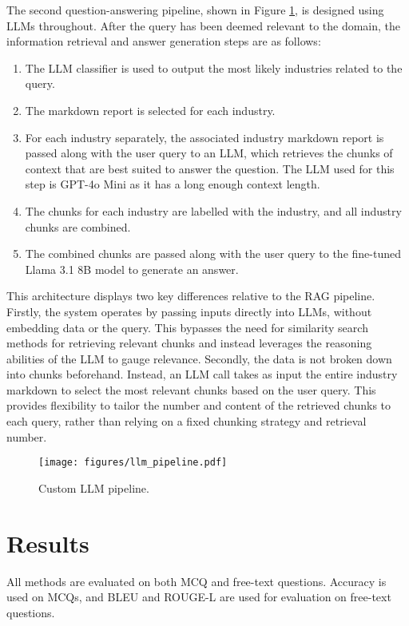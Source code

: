 The second question-answering pipeline, shown in Figure \ref{fig:llm_rag}, is designed using LLMs throughout. After the query has been deemed relevant to the domain, the information retrieval and answer generation steps are as follows:
\begin{enumerate}
    \item The LLM classifier is used to output the most likely industries related to the query.
    \item The markdown report is selected for each industry. 
    \item For each industry separately, the associated industry markdown report is passed along with the user query to an LLM, which retrieves the chunks of context that are best suited to answer the question. The LLM used for this step is GPT-4o Mini as it has a long enough context length.
    \item The chunks for each industry are labelled with the industry, and all industry chunks are combined.
    \item The combined chunks are passed along with the user query to the fine-tuned Llama 3.1 8B model to generate an answer.
\end{enumerate}


This architecture displays two key differences relative to the RAG pipeline. Firstly, the system operates by passing inputs directly into LLMs, without embedding data or the query. This bypasses the need for similarity search methods for retrieving relevant chunks and instead leverages the reasoning abilities of the LLM to gauge relevance. Secondly, the data is not broken down into chunks beforehand. Instead, an LLM call takes as input the entire industry markdown to select the most relevant chunks based on the user query. This provides flexibility to tailor the number and content of the retrieved chunks to each query, rather than relying on a fixed chunking strategy and retrieval number. \\


\begin{figure}[H]
    \centering
    \texttt{[image: figures/llm\_pipeline.pdf]}
    \caption{Custom LLM pipeline.}
    \label{fig:llm_rag}
\end{figure}


\section{Results}

All methods are evaluated on both MCQ and free-text questions. Accuracy is used on MCQs, and BLEU and ROUGE-L are used for evaluation on free-text questions.

